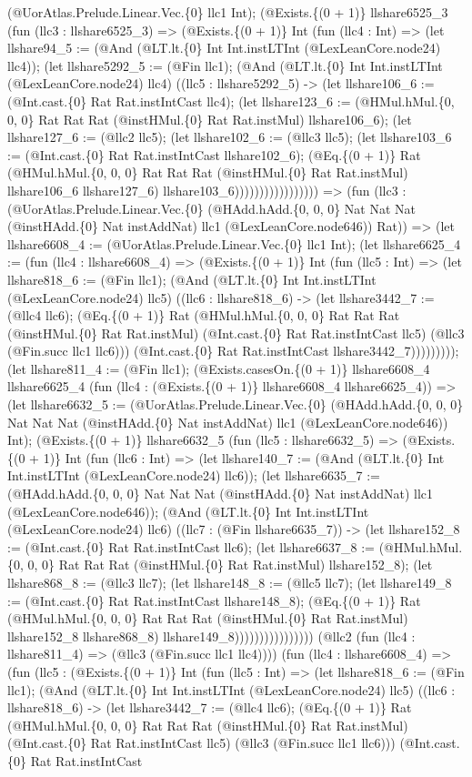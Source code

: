 \documentclass[11pt]{article}
\begin{document}
(@UorAtlas.Prelude.Linear.Vec.\{0\} llc1 Int); (@Exists.\{(0 + 1)\} llshare6525\_3 (fun (llc3 : llshare6525\_3) => (@Exists.\{(0 + 1)\} Int (fun (llc4 : Int) => (let llshare94\_5 := (@And (@LT.lt.\{0\} Int Int.instLTInt (@LexLeanCore.node24) llc4)); (let llshare5292\_5 := (@Fin llc1); (@And (@LT.lt.\{0\} Int Int.instLTInt (@LexLeanCore.node24) llc4) ((llc5 : llshare5292\_5) -> (let llshare106\_6 := (@Int.cast.\{0\} Rat Rat.instIntCast llc4); (let llshare123\_6 := (@HMul.hMul.\{0, 0, 0\} Rat Rat Rat (@instHMul.\{0\} Rat Rat.instMul) llshare106\_6); (let llshare127\_6 := (@llc2 llc5); (let llshare102\_6 := (@llc3 llc5); (let llshare103\_6 := (@Int.cast.\{0\} Rat Rat.instIntCast llshare102\_6); (@Eq.\{(0 + 1)\} Rat (@HMul.hMul.\{0, 0, 0\} Rat Rat Rat (@instHMul.\{0\} Rat Rat.instMul) llshare106\_6 llshare127\_6) llshare103\_6))))))))))))))))) => (fun (llc3 : (@UorAtlas.Prelude.Linear.Vec.\{0\} (@HAdd.hAdd.\{0, 0, 0\} Nat Nat Nat (@instHAdd.\{0\} Nat instAddNat) llc1 (@LexLeanCore.node646)) Rat)) => (let llshare6608\_4 := (@UorAtlas.Prelude.Linear.Vec.\{0\} llc1 Int); (let llshare6625\_4 := (fun (llc4 : llshare6608\_4) => (@Exists.\{(0 + 1)\} Int (fun (llc5 : Int) => (let llshare818\_6 := (@Fin llc1); (@And (@LT.lt.\{0\} Int Int.instLTInt (@LexLeanCore.node24) llc5) ((llc6 : llshare818\_6) -> (let llshare3442\_7 := (@llc4 llc6); (@Eq.\{(0 + 1)\} Rat (@HMul.hMul.\{0, 0, 0\} Rat Rat Rat (@instHMul.\{0\} Rat Rat.instMul) (@Int.cast.\{0\} Rat Rat.instIntCast llc5) (@llc3 (@Fin.succ llc1 llc6))) (@Int.cast.\{0\} Rat Rat.instIntCast llshare3442\_7))))))))); (let llshare811\_4 := (@Fin llc1); (@Exists.casesOn.\{(0 + 1)\} llshare6608\_4 llshare6625\_4 (fun (llc4 : (@Exists.\{(0 + 1)\} llshare6608\_4 llshare6625\_4)) => (let llshare6632\_5 := (@UorAtlas.Prelude.Linear.Vec.\{0\} (@HAdd.hAdd.\{0, 0, 0\} Nat Nat Nat (@instHAdd.\{0\} Nat instAddNat) llc1 (@LexLeanCore.node646)) Int); (@Exists.\{(0 + 1)\} llshare6632\_5 (fun (llc5 : llshare6632\_5) => (@Exists.\{(0 + 1)\} Int (fun (llc6 : Int) => (let llshare140\_7 := (@And (@LT.lt.\{0\} Int Int.instLTInt (@LexLeanCore.node24) llc6)); (let llshare6635\_7 := (@HAdd.hAdd.\{0, 0, 0\} Nat Nat Nat (@instHAdd.\{0\} Nat instAddNat) llc1 (@LexLeanCore.node646)); (@And (@LT.lt.\{0\} Int Int.instLTInt (@LexLeanCore.node24) llc6) ((llc7 : (@Fin llshare6635\_7)) -> (let llshare152\_8 := (@Int.cast.\{0\} Rat Rat.instIntCast llc6); (let llshare6637\_8 := (@HMul.hMul.\{0, 0, 0\} Rat Rat Rat (@instHMul.\{0\} Rat Rat.instMul) llshare152\_8); (let llshare868\_8 := (@llc3 llc7); (let llshare148\_8 := (@llc5 llc7); (let llshare149\_8 := (@Int.cast.\{0\} Rat Rat.instIntCast llshare148\_8); (@Eq.\{(0 + 1)\} Rat (@HMul.hMul.\{0, 0, 0\} Rat Rat Rat (@instHMul.\{0\} Rat Rat.instMul) llshare152\_8 llshare868\_8) llshare149\_8)))))))))))))))) (@llc2 (fun (llc4 : llshare811\_4) => (@llc3 (@Fin.succ llc1 llc4)))) (fun (llc4 : llshare6608\_4) => (fun (llc5 : (@Exists.\{(0 + 1)\} Int (fun (llc5 : Int) => (let llshare818\_6 := (@Fin llc1); (@And (@LT.lt.\{0\} Int Int.instLTInt (@LexLeanCore.node24) llc5) ((llc6 : llshare818\_6) -> (let llshare3442\_7 := (@llc4 llc6); (@Eq.\{(0 + 1)\} Rat (@HMul.hMul.\{0, 0, 0\} Rat Rat Rat (@instHMul.\{0\} Rat Rat.instMul) (@Int.cast.\{0\} Rat Rat.instIntCast llc5) (@llc3 (@Fin.succ llc1 llc6))) (@Int.cast.\{0\} Rat Rat.instIntCast 
\end{document}
